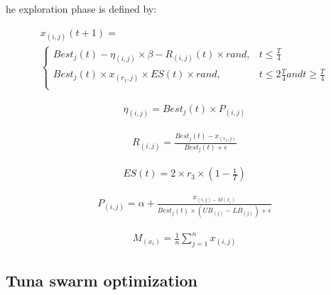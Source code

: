 \documentclass{elsarticle}
\begin{document}
he exploration phase is defined by:

\begin{equation}
\begin{gathered}
x_{(i,j)}(t+1)=\\
\begin{cases}
Best_j (t) - \eta_{(i,j)} \times \beta - R_{(i,j)}(t) \times rand, & t \leq \frac{T}{4} \\
Best_j (t) \times x_{(r_1,j)} \times ES(t) \times rand, & t \leq 2\frac{T}{4} and t \geq \frac{T}{4} \\
\end{cases}
\end{gathered}
\label{eq34}
\end{equation}   

\begin{equation}
\begin{gathered}
\eta_{(i,j)} = Best_j(t) \times P_{(i,j)}
\end{gathered}
\label{eq35}
\end{equation}

\begin{equation}
\begin{gathered}
R_{(i,j)} = \frac{Best_j(t) - x_{(r_2,j)}}{Best_j(t) + \epsilon}
\end{gathered}
\label{eq36}
\end{equation}

\begin{equation}
\begin{gathered}
ES(t) = 2 \times r_3 \times (1 - \frac{1}{T})
\end{gathered}
\label{eq37}
\end{equation}

\begin{equation}
\begin{gathered}
P_{(i,j)} = \alpha + \frac{x_{(i,j) - M(x_i)}}{Best_j(t) \times (UB_{(j)}-LB_{(j)}) + \epsilon} 
\end{gathered}
\label{eq38}
\end{equation}

\begin{equation}
\begin{gathered}
M_{(x_i)} = \frac{1}{n} \sum_{j=1}^{n} x_{(i,j)}
\end{gathered}
\label{eq39}
\end{equation}

\subsection{Tuna swarm optimization}
\end{document}
